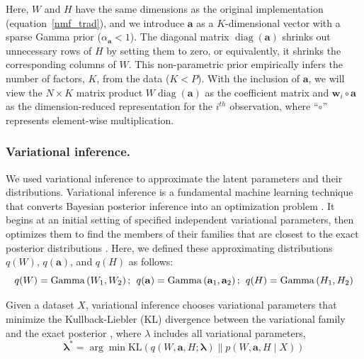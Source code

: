 Here, $W$ and $H$ have the same dimensions as the original implementation (equation~\ref{nmf_trad}), and we introduce $\mathbf{a}$ as a $K$-dimensional vector with a sparse Gamma prior ($\alpha_\mathbf{a} < 1$). The diagonal matrix $\operatorname{diag}(\mathbf{a})$ shrinks out unnecessary rows of $H$ by setting them to zero, or equivalently, it shrinks the corresponding columns of $W$. This non-parametric prior empirically infers the number of factors, $K$, from the data ($K < P$). With the inclusion of $\mathbf{a}$, we will view the $N \times K$ matrix product $W\operatorname{diag}(\mathbf{a})$ as the coefficient matrix and $\mathbf{w}_{i} \circ \mathbf{a}$ as the dimension-reduced representation for the $i^{th}$ observation, where ``$\circ$'' represents element-wise multiplication.

\subsubsection{Variational inference.}
\label{methods_vi}
We used variational inference to approximate the latent parameters and their distributions. Variational inference is a fundamental machine learning technique that converts Bayesian posterior inference into an optimization problem \citep{jordan2004graphical,ormerod2010explaining}. It begins at an initial setting of specified independent variational parameters, then optimizes them to find the members of their families that are closest to the exact posterior distributions \citep{wainwright2008graphical}. Here, we defined these approximating distributions $q(W)$, $q(\mathbf{a})$, and $q(H)$ as follows:
\begin{equation}
q(W) =\operatorname{Gamma}\left(W_{1}, W_{2}\right); \hspace{1ex} q(\mathbf{a})=\operatorname{Gamma}\left(\mathbf{a}_{1}, \mathbf{a}_{2}\right); \hspace{1ex}
q(H) =\operatorname{Gamma}\left(H_{1}, H_{2}\right)
\end{equation}

Given a dataset $X$, variational inference chooses variational parameters that minimize the Kullback-Liebler (KL) divergence between the variational family and the exact posterior \citep{jordan1999introduction}, where $\lambda$ includes all variational parameters, 
\begin{equation}
    \boldsymbol{\lambda}^{*}=\arg \min \mathrm{KL}(q(W, \mathbf{a}, H ; \boldsymbol{\lambda}) \| p(W, \mathbf{a}, H \mid X))
\end{equation}

